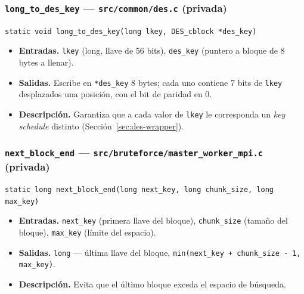 \documentclass[11pt,letterpaper]{article}
\begin{document}
\subsubsection*{\texttt{long\_to\_des\_key} --- \texttt{src/common/des.c} (privada)}
\small\texttt{static void long\_to\_des\_key(long lkey, DES\_cblock *des\_key)}\normalsize
\begin{itemize}[nosep]
    \item \textbf{Entradas.} \texttt{lkey} (long, llave de 56 bits), \texttt{des\_key} (puntero a bloque de 8 bytes a llenar).
    \item \textbf{Salidas.} Escribe en \texttt{*des\_key} 8 bytes; cada uno contiene 7 bits de \texttt{lkey} desplazados una posición, con el bit de paridad en 0.
    \item \textbf{Descripción.} Garantiza que a cada valor de \texttt{lkey} le corresponda un \textit{key schedule} distinto (Sección~\ref{sec:des-wrapper}).
\end{itemize}

\subsubsection*{\texttt{next\_block\_end} --- \texttt{src/bruteforce/master\_worker\_mpi.c} (privada)}
\small\texttt{static long next\_block\_end(long next\_key, long chunk\_size, long max\_key)}\normalsize
\begin{itemize}[nosep]
    \item \textbf{Entradas.} \texttt{next\_key} (primera llave del bloque), \texttt{chunk\_size} (tamaño del bloque), \texttt{max\_key} (límite del espacio).
    \item \textbf{Salidas.} \texttt{long} --- última llave del bloque, \texttt{min(next\_key + chunk\_size - 1, max\_key)}.
    \item \textbf{Descripción.} Evita que el último bloque exceda el espacio de búsqueda.
\end{itemize}
\end{document}
